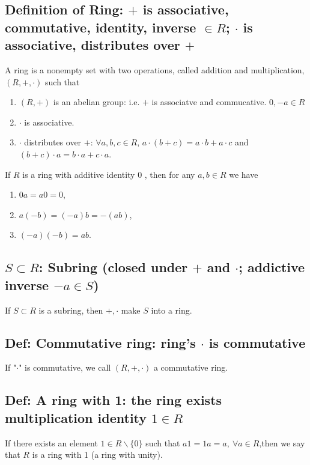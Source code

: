 \documentclass[11pt]{elegantbook}
\begin{document}
\subsection{Definition of Ring: $+$ is associative, commutative, identity, inverse $\in R$; $\cdot$ is associative, distributes over $+$}
\begin{definition}[Ring]
    \normalfont
    A ring is a nonempty set with two operations, called addition and multiplication, $(R,+,\cdot)$ such that
    \begin{enumerate}[(1).]
        \item $(R,+)$ is an abelian group: i.e. $+$ is associatve and commucative. $0,-a\in R$
        \item $\cdot$ is associative.
        \item $\cdot$ distributes over $+$: $\forall a,b,c\in R$, $a\cdot(b+c)=a\cdot b+a\cdot c$ and $(b+c)\cdot a=b\cdot a+c\cdot a$.
    \end{enumerate}
\end{definition}

\begin{theorem}
    If $R$ is a ring with additive identity 0 , then for any $a, b \in R$ we have
    \begin{enumerate}[(1).]
        \item $0 a=a 0=0$,
        \item $a(-b)=(-a) b=-(a b)$,
        \item $(-a)(-b)=a b$.
    \end{enumerate}
\end{theorem}

\subsection{$S\subset R$: Subring (closed under $+$ and $\cdot$; addictive inverse $-a\in S$)}
\begin{proposition}[Proposition 2.6.27]
    If $S\subset R$ is a subring, then $+,\cdot$ make $S$ into a ring.
\end{proposition}

\subsection{Def: Commutative ring: ring's $\cdot$ is commutative}
If "$\cdot$" is commutative, we call $(R, +, \cdot)$ a commutative ring.
\subsection{Def: A ring with 1: the ring exists multiplication identity $1\in R$}
If there exists an element $1\in R\backslash \{0\}$ such that $a1=1a=a,\ \forall a\in R$,then we say that $R$ is a ring with 1 (a ring with unity).
\end{document}
